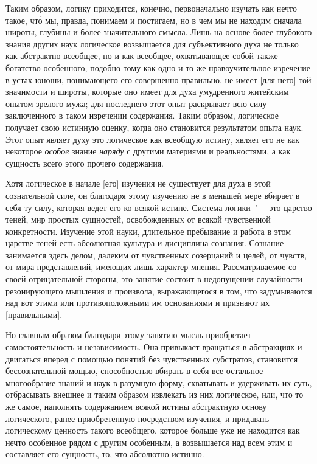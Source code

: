 Таким образом, логику приходится, конечно, первоначально
изучать как нечто такое, чт\'о мы, правда, понимаем
и постигаем, но в чем мы не находим сначала широты,
глубины и более значительного смысла. Лишь
на основе более глубокого знания других наук логическое
возвышается для субъективного духа не только как
абстрактно всеобщее, но и как всеобщее, охватывающее
собой также богатство особенного, подобно тому как одно
и то же нравоучительное изречение в устах юноши, понимающего
его совершенно правильно, не имеет [для
него] той значимости и широты, которые оно имеет
для духа умудренного житейским опытом зрелого мужа;
для последнего этот опыт раскрывает всю силу заключенного
в таком изречении содержания. Таким образом,
логическое получает свою истинную оценку, когда оно
становится результатом опыта наук. Этот опыт являет
духу это логическое как всеобщую истину, являет его
не как некоторое \emph{особое} знание \emph{наряду} с другими материями
и реальностями, а как сущность всего этого прочего
содержания.

Хотя логическое в начале [его] изучения не существует
для духа в этой сознательной силе, он благодаря этому
изучению не в меньшей мере вбирает в себя ту силу,
которая ведет его ко всякой истине. Система логики~"---
это царство теней, мир простых сущностей, освобожденных
от всякой чувственной конкретности. Изучение этой
науки, длительное пребывание и работа в этом царстве
теней есть абсолютная культура и дисциплина сознания.
Сознание занимается здесь делом, далеким от чувственных
созерцаний и целей, от чувств, от мира представлений,
имеющих лишь характер мнения. Рассматриваемое
со своей отрицательной стороны, это занятие состоит
в недопущении случайности резонирующего мышления
и произвола, выражающегося в том, что задумываются
над вот этими или противоположными им основаниями
и признают их [правильными].

Но главным образом благодаря этому занятию мысль
приобретает самостоятельность и независимость. Она привыкает
вращаться в абстракциях и двигаться вперед
с помощью понятий без чувственных субстратов, становится
бессознательной мощью, способностью вбирать
в себя все остальное многообразие знаний и наук в разумную
форму, схватывать и удерживать их суть, отбрасывать
внешнее и таким образом извлекать из них логическое,
или, что то же самое, наполнять содержанием
всякой истины абстрактную основу логического, ранее
приобретенную посредством изучения, и придавать логическому
ценность такого всеобщего, которое больше уже
не находится как нечто особенное рядом с другим особенным,
а возвышается над всем этим и составляет его
сущность, то, что абсолютно истинно.



